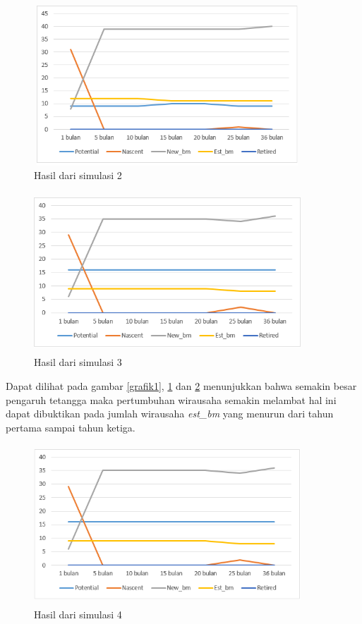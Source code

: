 	\begin{figure} [H]
	\centering  
	\includegraphics[width=10cm, height=6cm]{grafik2} 
		\caption[Hasil dari simulasi]{Hasil dari simulasi 2}
	\label{grafik2} 
\end{figure}

	\begin{figure} [H]
	\centering  
	\includegraphics[width=10cm, height=6cm]{grafik3} 
		\caption[Hasil dari simulasi]{Hasil dari simulasi 3}
	\label{grafik3} 
\end{figure}

Dapat dilihat pada gambar \ref{grafik1}, \ref{grafik2} dan \ref{grafik3} menunjukkan bahwa semakin besar pengaruh tetangga maka pertumbuhan wirausaha semakin melambat hal ini dapat dibuktikan pada jumlah wirausaha \textit{est\_bm} yang menurun dari tahun pertama sampai tahun ketiga.

	\begin{figure} [H]
	\centering  
	\includegraphics[width=10cm, height=6cm]{grafik4} 
		\caption[Hasil dari simulasi]{Hasil dari simulasi 4}
	\label{grafik4} 
\end{figure}

